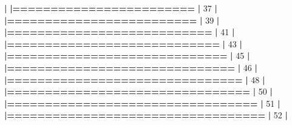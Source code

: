 \documentclass[]{book}
\newenvironment{Shaded}{\begin{snugshade}}{\end{snugshade}}
\newcommand{\DecValTok}[1]{\textcolor[rgb]{0.00,0.00,0.81}{#1}}
\newcommand{\ErrorTok}[1]{\textcolor[rgb]{0.64,0.00,0.00}{\textbf{#1}}}
\newcommand{\NormalTok}[1]{#1}
\newcommand{\OperatorTok}[1]{\textcolor[rgb]{0.81,0.36,0.00}{\textbf{#1}}}
\newcommand{\StringTok}[1]{\textcolor[rgb]{0.31,0.60,0.02}{#1}}
\begin{document}
\begin{Shaded}
\begin{Highlighting}[]
{{{{{{{{{{{{{{{{{{{{{{{{{{{{{  \OperatorTok{|}\StringTok{                                                                       }
\StringTok{  }\ErrorTok{|========================}\StringTok{                                         }\ErrorTok{|}\StringTok{  }\DecValTok{37}\NormalTok{%}
  \OperatorTok{|}\StringTok{                                                                       }
\StringTok{  }\ErrorTok{|=========================}\StringTok{                                        }\ErrorTok{|}\StringTok{  }\DecValTok{39}\NormalTok{%}
  \OperatorTok{|}\StringTok{                                                                       }
\StringTok{  }\ErrorTok{|===========================}\StringTok{                                      }\ErrorTok{|}\StringTok{  }\DecValTok{41}\NormalTok{%}
  \OperatorTok{|}\StringTok{                                                                       }
\StringTok{  }\ErrorTok{|============================}\StringTok{                                     }\ErrorTok{|}\StringTok{  }\DecValTok{43}\NormalTok{%}
  \OperatorTok{|}\StringTok{                                                                       }
\StringTok{  }\ErrorTok{|=============================}\StringTok{                                    }\ErrorTok{|}\StringTok{  }\DecValTok{45}\NormalTok{%}
  \OperatorTok{|}\StringTok{                                                                       }
\StringTok{  }\ErrorTok{|==============================}\StringTok{                                   }\ErrorTok{|}\StringTok{  }\DecValTok{46}\NormalTok{%}
  \OperatorTok{|}\StringTok{                                                                       }
\StringTok{  }\ErrorTok{|===============================}\StringTok{                                  }\ErrorTok{|}\StringTok{  }\DecValTok{48}\NormalTok{%}
  \OperatorTok{|}\StringTok{                                                                       }
\StringTok{  }\ErrorTok{|================================}\StringTok{                                 }\ErrorTok{|}\StringTok{  }\DecValTok{50}\NormalTok{%}
  \OperatorTok{|}\StringTok{                                                                       }
\StringTok{  }\ErrorTok{|=================================}\StringTok{                                }\ErrorTok{|}\StringTok{  }\DecValTok{51}\NormalTok{%}
  \OperatorTok{|}\StringTok{                                                                       }
\StringTok{  }\ErrorTok{|==================================}\StringTok{                               }\ErrorTok{|}\StringTok{  }\DecValTok{52}\NormalTok{%}
  \OperatorTok{|}\StringTok{                                                                       }
}}}}}}}}}}}}}}}}}}}}}}}}}}}}}}}}}}}}}}}
\end{Highlighting}
\end{Shaded}
\end{document}
